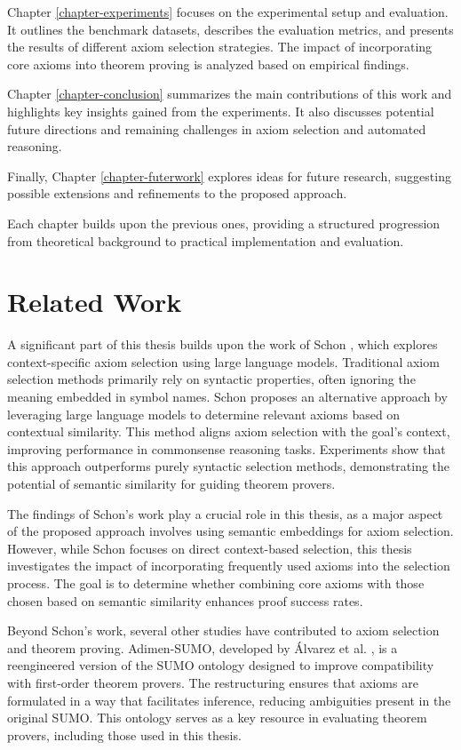 \documentclass[english,version-2020-11]{uzl-thesis}
\begin{document}
Chapter \ref{chapter-experiments} focuses on the experimental setup and evaluation. It outlines the benchmark datasets, describes the evaluation metrics, and presents the results of different axiom selection strategies. The impact of incorporating core axioms into theorem proving is analyzed based on empirical findings.

Chapter \ref{chapter-conclusion} summarizes the main contributions of this work and highlights key insights gained from the experiments. It also discusses potential future directions and remaining challenges in axiom selection and automated reasoning.

Finally, Chapter \ref{chapter-futerwork} explores ideas for future research, suggesting possible extensions and refinements to the proposed approach.

Each chapter builds upon the previous ones, providing a structured progression from theoretical background to practical implementation and evaluation.



\chapter{Related Work}
\label{chapter-relatedwork}

A significant part of this thesis builds upon the work of Schon \cite{Schon2024}, which explores context-specific axiom selection using large language models. Traditional axiom selection methods primarily rely on syntactic properties, often ignoring the meaning embedded in symbol names. Schon proposes an alternative approach by leveraging large language models to determine relevant axioms based on contextual similarity. This method aligns axiom selection with the goal’s context, improving performance in commonsense reasoning tasks. Experiments show that this approach outperforms purely syntactic selection methods, demonstrating the potential of semantic similarity for guiding theorem provers.

The findings of Schon's work play a crucial role in this thesis, as a major aspect of the proposed approach involves using semantic embeddings for axiom selection. However, while Schon focuses on direct context-based selection, this thesis investigates the impact of incorporating frequently used axioms into the selection process. The goal is to determine whether combining core axioms with those chosen based on semantic similarity enhances proof success rates.

Beyond Schon’s work, several other studies have contributed to axiom selection and theorem proving. Adimen-SUMO, developed by Álvarez et al. \cite{Alvez2014}, is a reengineered version of the SUMO ontology designed to improve compatibility with first-order theorem provers. The restructuring ensures that axioms are formulated in a way that facilitates inference, reducing ambiguities present in the original SUMO. This ontology serves as a key resource in evaluating theorem provers, including those used in this thesis.
\end{document}
